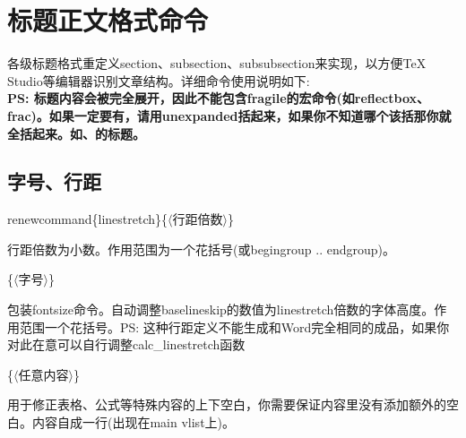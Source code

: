 \documentclass[a4paper]{article}
\begin{document}
	\section{标题正文格式命令}
	\begin{body}
		各级标题格式重定义{\color{purple}\bslash{}section}、{\color{purple}\bslash{}subsection}、{\color{purple}\bslash{}subsubsection}来实现，以方便TeX Studio等编辑器识别文章结构。详细命令使用说明如下:\\[-2pt]
		\textbf{PS: 标题内容会被完全展开，因此不能包含\gqq{}fragile\cqq{}的宏命令(如{\color{purple}{\bslash}reflectbox}、{\color{purple}{\bslash}frac})。如果一定要有，请用{\color{purple}{\bslash}unexpanded}括起来，如果你不知道哪个该括那你就全括起来。如、的标题。}\par
	\end{body}
	\subsection{字号、行距}
	\begin{body}
		{\noindent\color{purple}\bslash{}renewcommand}\{{\color{purple}\bslash{}linestretch}\}\{{\color{gray}$\langle${}行距倍数$\rangle$}\}\par
		行距倍数为小数。作用范围为一个花括号(或{\color{purple}\bslash{}begingroup} .. {\color{purple}\bslash{}endgroup})。\par
		\{{\color{gray}$\langle$字号$\rangle$}\}\par
		包装{\color{purple}{\bslash}fontsize}命令。自动调整{\color{purple}\bslash{}baselineskip}的数值为{\color{purple}\bslash{}linestretch}倍数的字体高度。作用范围一个花括号。PS: 这种行距定义不能生成和Word完全相同的成品，如果你对此在意可以自行调整calc\_linestretch函数\par
		\{{\color{gray}$\langle$任意内容$\rangle$}\}\par
		用于修正表格、公式等特殊内容的上下空白，你需要保证内容里没有添加额外的空白。内容自成一行(出现在\gqq{}main vlist\cqq{}上)。\par
	\end{body}
\end{document}
